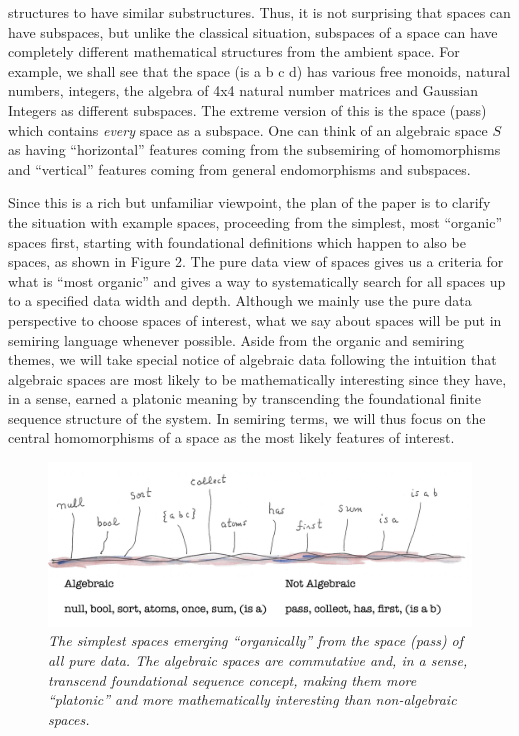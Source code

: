 \documentclass[11pt]{article}
\begin{document}
\begin{itemize}
{structures to have similar substructures.  Thus, it is not surprising that spaces can have subspaces, but unlike the classical situation, 
subspaces of a space can have completely different mathematical structures from the ambient space.  For example, we shall see that 
the space (is a b c d) has various free monoids, natural numbers, integers, the algebra of 4x4 natural number matrices and 
Gaussian Integers as different subspaces.  The extreme version of this is the space (pass) which contains {\it every} space as a subspace.  One can think of 
an algebraic space $S$ as having ``horizontal'' features coming from the subsemiring of homomorphisms and ``vertical'' features 
coming from general endomorphisms and subspaces.} 
\end{itemize}
Since this is a rich but unfamiliar 
viewpoint, the plan of the paper is to clarify the situation with example spaces, proceeding 
from the simplest, most ``organic'' spaces first, starting with foundational definitions which happen to also 
be spaces, as shown in Figure 2.  The pure data view of spaces gives us a criteria for what is ``most organic'' and gives a way to systematically 
search for all spaces up to a specified data width and depth.  Although we mainly use the pure data perspective to 
choose spaces of interest, what we say about spaces will be put in semiring language whenever possible.  Aside from 
the organic and semiring themes, we will take special notice of algebraic data following the intuition that algebraic 
spaces are most likely to be mathematically interesting since they have, in a sense, earned a platonic meaning by 
transcending the foundational finite sequence structure of the system.  In semiring terms, we will thus focus on
the central homomorphisms of a space as the most likely features of interest. 

\begin{figure}[h]
\centering
\includegraphics[width=1.0\textwidth]{start-garden.png}
\caption{{\it The simplest spaces emerging ``organically'' from the space (pass) of all pure data.  The algebraic spaces are commutative and, 
in a sense, transcend foundational sequence concept, making them more ``platonic'' and more mathematically interesting than non-algebraic spaces.}} 
\end{figure}
\end{document}

